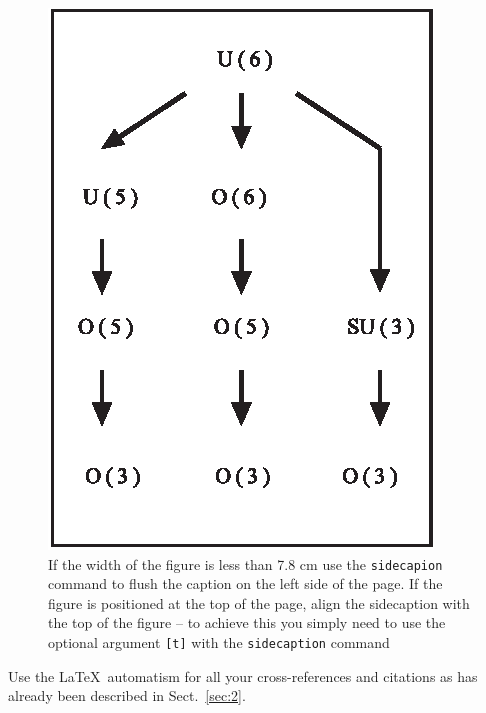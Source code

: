 \documentclass[graybox]{svmult}
\begin{document}
\begin{figure}[t]
\sidecaption[t]
\includegraphics[scale=.65]{figure}
%
%
\caption{If the width of the figure is less than 7.8 cm use the \texttt{sidecapion} command to flush the caption on the left side of the page. If the figure is positioned at the top of the page, align the sidecaption with the top of the figure -- to achieve this you simply need to use the optional argument \texttt{[t]} with the \texttt{sidecaption} command}
\label{fig:2}       %
\end{figure}

 Use the \LaTeX\ automatism for all your cross-references and citations as has already been described in Sect.~\ref{sec:2}.
\end{document}
